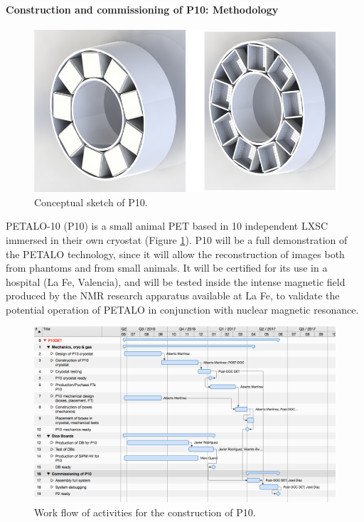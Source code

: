 \paragraph{Construction and commissioning of P10: Methodology}

\begin{figure}[!htb]
	\centering
	\includegraphics[scale=0.5]{img/SAP.png}
	\caption{\label{fig.P10} Conceptual sketch of P10.  }
\end{figure}

PETALO-10 (P10) is a small animal PET based in 10 independent LXSC immersed in their own cryostat  (Figure \ref{fig.P10}). P10 will be a full demonstration of the PETALO technology, since it will allow the reconstruction of images both from phantoms and from small animals. It will be certified for its use in a hospital (La Fe, Valencia), and will be tested inside the intense magnetic field produced by the NMR research apparatus available at La Fe, to validate the potential operation of PETALO in conjunction with nuclear magnetic resonance.  

\begin{figure}[!htb]
	\centering
	\includegraphics[scale=0.5]{img/P10WF.png}
	\caption{\label{fig.P10WF} Work flow of activities for the construction of P10.  }
\end{figure}

